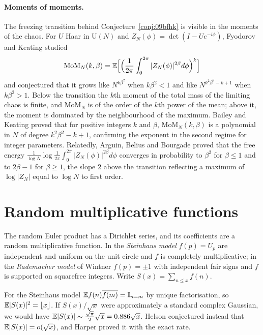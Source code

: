 \paragraph{Moments of moments.} The freezing transition behind Conjecture~\ref{conj:09bfhk} is visible in the moments of the chaos. For $U$ Haar in $\mathrm{U}(N)$ and $Z_N(\phi)=\det(I-Ue^{-i\phi})$, Fyodorov and Keating \cite{fyodorovkeating2014} studied
\[
\mathrm{MoM}_N(k,\beta)=\mathbb{E}\Bigl[\Bigl(\frac1{2\pi}\int_0^{2\pi}|Z_N(\phi)|^{2\beta}d\phi\Bigr)^k\Bigr]
\]
and conjectured that it grows like $N^{k\beta^2}$ when $k\beta^2<1$ and like $N^{k^2\beta^2-k+1}$ when $k\beta^2>1$. Below the transition the $k$th moment of the total mass of the limiting chaos is finite, and $\mathrm{MoM}_N$ is of the order of the $k$th power of the mean; above it, the moment is dominated by the neighbourhood of the maximum. Bailey and Keating \cite{baileykeating2019} proved that for positive integers $k$ and $\beta$, $\mathrm{MoM}_N(k,\beta)$ is a polynomial in $N$ of degree $k^2\beta^2-k+1$, confirming the exponent in the second regime for integer parameters. Relatedly, Arguin, Belius and Bourgade \cite{abb2017} proved that the free energy $\frac1{\log N}\log\frac1{2\pi}\int_0^{2\pi}|Z_N(\phi)|^{2\beta}d\phi$ converges in probability to $\beta^2$ for $\beta\le1$ and to $2\beta-1$ for $\beta\ge1$, the slope $2$ above the transition reflecting a maximum of $\log|Z_N|$ equal to $\log N$ to first order.

\section{Random multiplicative functions}\label{sec:09bharper}

The random Euler product has a Dirichlet series, and its coefficients are a random multiplicative function. In the \emph{Steinhaus model} $f(p)=U_p$ are independent and uniform on the unit circle and $f$ is completely multiplicative; in the \emph{Rademacher model} of Wintner \cite{wintner1944} $f(p)=\pm1$ with independent fair signs and $f$ is supported on squarefree integers. Write $S(x)=\sum_{n\le x}f(n)$.

For the Steinhaus model $\mathbb{E} f(n)\overline{f(m)}=\mathbb{I}_{n=m}$ by unique factorisation, so $\mathbb{E}|S(x)|^2=\lfloor x\rfloor$. If $S(x)/\sqrt x$ were approximately a standard complex Gaussian, we would have $\mathbb{E}|S(x)|\sim\frac{\sqrt\pi}{2}\sqrt x=0.886\sqrt x$. Helson \cite{helson2010} conjectured instead that $\mathbb{E}|S(x)|=o(\sqrt x)$, and Harper proved it with the exact rate.

